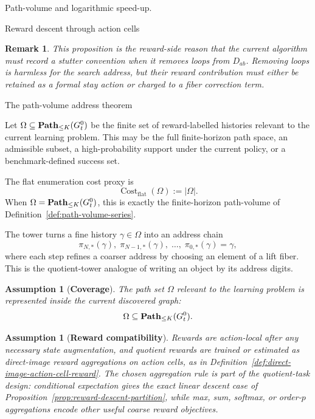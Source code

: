 \documentclass[11pt]{article}
\newtheorem{assumption}[subsubsection]{Assumption}
\newtheorem{remark}[subsubsection]{Remark}
\newcommand{\cost}{\operatorname{Cost}}
\begin{document}
\begin{section}{Path-volume and logarithmic speed-up.}
\begin{subsection}{Reward descent through action cells}
\begin{remark}
This proposition is the reward-side reason that the current algorithm must record a stutter convention when it removes loops from $D_{ab}$. Removing loops is harmless for the search address, but their reward contribution must either be retained as a formal stay action or charged to a fiber correction term.
\end{remark}

\end{subsection}

\begin{subsection}{The path-volume address theorem}

Let
$
\Omega\subseteq\bold{Path}_{\le K}(G_t^0)
$
be the finite set of reward-labelled histories relevant to the current learning problem. This may be the full finite-horizon path space, an admissible subset, a high-probability support under the current policy, or a benchmark-defined success set.

The flat enumeration cost proxy is
$$
\cost_{\mathrm{flat}}(\Omega):=|\Omega|.
$$
When $\Omega=\bold{Path}_{\le K}(G_t^0)$, this is exactly the finite-horizon path-volume of Definition~\ref{def:path-volume-series}.

The tower turns a fine history $\gamma\in\Omega$ into an address chain
$$
\pi_{N,*}(\gamma),\;
\pi_{N-1,*}(\gamma),\;
\ldots,\;
\pi_{0,*}(\gamma)=\gamma,
$$
where each step refines a coarser address by choosing an element of a lift fiber. This is the quotient-tower analogue of writing an object by its address digits.

\begin{assumption}[{\bf Coverage}]\label{ass:path-volume-coverage}
\normalfont
The path set $\Omega$ relevant to the learning problem is represented inside the current discovered graph:
$$
\Omega\subseteq\bold{Path}_{\le K}(G_t^0).
$$
\end{assumption}

\begin{assumption}[{\bf Reward compatibility}]\label{ass:path-volume-reward-compat}
\normalfont
Rewards are action-local after any necessary state augmentation, and quotient rewards are trained or estimated as direct-image reward aggregations on action cells, as in Definition~\ref{def:direct-image-action-cell-reward}. The chosen aggregation rule is part of the quotient-task design: conditional expectation gives the exact linear descent case of Proposition~\ref{prop:reward-descent-partition}, while max, sum, softmax, or order-$p$ aggregations encode other useful coarse reward objectives.
\end{assumption}


\end{subsection}
\end{section}
\end{document}
